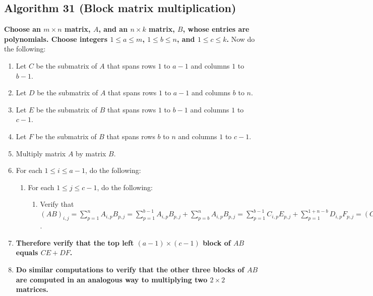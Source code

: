 \documentclass[twocolumn]{article}
\begin{document}
		\subsection{Algorithm 31 (Block matrix multiplication)}\label{sec:algorithm 31}
			\textbf{Choose an $m\times n$ matrix, $A$, and an $n\times k$ matrix, $B$, whose entries are polynomials. Choose integers $1\le a\le m$, $1\le b\le n$, and $1\le c\le k$.} Now do the following:
			\begin{enumerate}
				\item Let $C$ be the submatrix of $A$ that spans rows $1$ to $a-1$ and columns $1$ to $b-1$.
				\item Let $D$ be the submatrix of $A$ that spans rows $1$ to $a-1$ and columns $b$ to $n$.
				\item Let $E$ be the submatrix of $B$ that spans rows $1$ to $b-1$ and columns $1$ to $c-1$.
				\item Let $F$ be the submatrix of $B$ that spans rows $b$ to $n$ and columns $1$ to $c-1$.
				\item Multiply matrix $A$ by matrix $B$.
				\item For each $1\le i\le a-1$, do the following:
				\begin{enumerate}
					\item For each $1\le j\le c-1$, do the following:
						\begin{enumerate}
							\item Verify that $(AB)_{i,j}=\sum_{p=1}^n A_{i,p}B_{p,j}=\sum_{p=1}^{b-1} A_{i,p}B_{p,j}+\sum_{p=b}^n A_{i,p}B_{p,j}=\sum_{p=1}^{b-1} C_{i,p}E_{p,j}+\sum_{p=1}^{1+n-b} D_{i,p}F_{p,j}=(CE)_{i,j}+(DF)_{i,j}$.
						\end{enumerate}
				\end{enumerate}
				\item \textbf{Therefore verify that the top left $(a-1)\times(c-1)$ block of $AB$ equals $CE+DF$.}
				\item \textbf{Do similar computations to verify that the other three blocks of $AB$ are computed in an analogous way to multiplying two $2\times 2$ matrices.}
			\end{enumerate}
\end{document}
